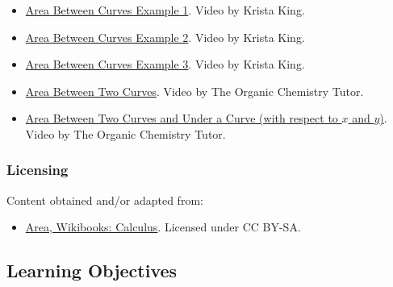 \begin{itemize}
\item \href{https://www.youtube.com/watch?v=E2ArQGWX8J4}{Area Between Curves Example 1}.  
Video by Krista King.

\item \href{https://www.youtube.com/watch?v=UV-fbgHa85s}{Area Between Curves Example 2}.  
Video by Krista King.

\item \href{https://www.youtube.com/watch?v=86ivXd4-BsU}{Area Between Curves Example 3}.  
Video by Krista King.

\item \href{https://youtu.be/ltxdcegn8xc}{Area Between Two Curves}.  
Video by The Organic Chemistry Tutor.

\item \href{https://youtu.be/wXMr2YYDMiM}{Area Between Two Curves and Under a Curve (with respect to $x$ and $y$)}.  
Video by The Organic Chemistry Tutor.

\end{itemize}

\subsubsection{Licensing}
\label{sss:lice-7352}

Content obtained and/or adapted from:

\begin{itemize}
\item \href{https://en.wikibooks.org/wiki/Calculus/Area}{Area, Wikibooks: Calculus}.  
Licensed under CC BY-SA.
\end{itemize}


\subsection{Learning Objectives}

